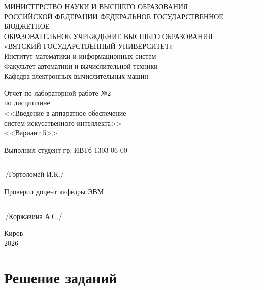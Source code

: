 \documentclass[oneside,a4paper,14pt]{extarticle} %
\begin{document}
	\newpage\thispagestyle{empty}
	\begin{center}
		МИНИСТЕРСТВО НАУКИ И ВЫСШЕГО ОБРАЗОВАНИЯ\\
			РОССИЙСКОЙ ФЕДЕРАЦИИ
			ФЕДЕРАЛЬНОЕ ГОСУДАРСТВЕННОЕ БЮДЖЕТНОЕ\\
			ОБРАЗОВАТЕЛЬНОЕ
			УЧРЕЖДЕНИЕ ВЫСШЕГО ОБРАЗОВАНИЯ\\
			«ВЯТСКИЙ ГОСУДАРСТВЕННЫЙ УНИВЕРСИТЕТ»\\
			Институт математики и информационных систем\\
			Факультет автоматики и вычислительной техники\\
			Кафедра электронных вычислительных машин
	\end{center}
	\vspace{20mm}

	\begin{center}
		Отчёт по лабораторной работе №2\\
		по дисциплине\\
		<<Введение в аппаратное обеспечение \\ систем искусственного интеллекта>>\\
		<<Вариант 5>>\\
	\end{center}
	\vspace{48mm}

	Выполнил студент гр. ИВТб-1303-06-00 \hspace{10mm} \rule[-0,5mm]{23mm}{0.15mm}\,/Гортоломей И.К./


	Проверил доцент кафедры ЭВМ \hfill  \rule[-0,5mm]{30mm}{0.15mm}\,/Коржавина А.С./

	\vfill
	\begin{center}
		Киров\\
		2026
	\end{center}

	\newpage%


	\section*{Решение заданий}
	
	\newpage
\end{document}
